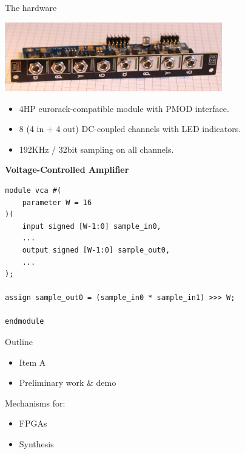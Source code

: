 \documentclass{beamer}
\begin{document}
\begin{frame}{The hardware}


    \begin{center}
        \includegraphics[height=3cm]{img/eurorack-pmod.jpg}
    \end{center}

    \begin{itemize}
        \item 4HP eurorack-compatible module with PMOD interface.
        \item 8 (4 in + 4 out) DC-coupled channels with LED indicators.
        \item 192KHz / 32bit sampling on all channels.
    \end{itemize}

\end{frame}


\begin{frame}[fragile]

    \textbf{Voltage-Controlled Amplifier}

    \begin{verbatim}
module vca #(
    parameter W = 16
)(
    input signed [W-1:0] sample_in0,
    ...
    output signed [W-1:0] sample_out0,
    ...
);

assign sample_out0 = (sample_in0 * sample_in1) >>> W;

endmodule
    \end{verbatim}

\end{frame}

\begin{frame}{Outline}

    \begin{itemize}
        \item Item A
        \item Preliminary work \& demo
    \end{itemize}

    \begin{block}{Mechanisms for:}
        \begin{itemize}
            \item FPGAs
            \item Synthesis
        \end{itemize}
    \end{block}

\end{frame}
\end{document}
